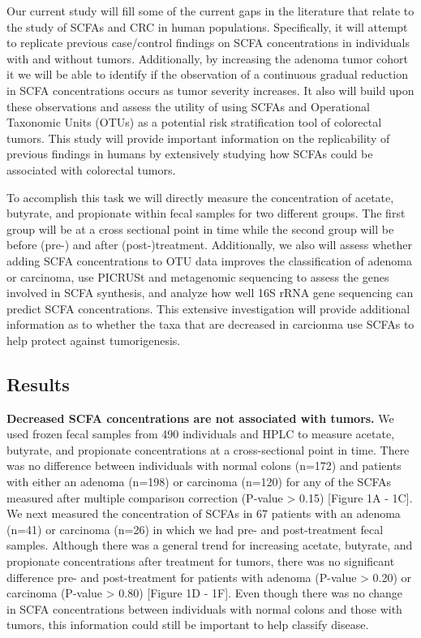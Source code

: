 \documentclass[11pt,]{article}
\begin{document}
Our current study will fill some of the current gaps in the literature
that relate to the study of SCFAs and CRC in human populations.
Specifically, it will attempt to replicate previous case/control
findings on SCFA concentrations in individuals with and without tumors.
Additionally, by increasing the adenoma tumor cohort it we will be able
to identify if the observation of a continuous gradual reduction in SCFA
concentrations occurs as tumor severity increases. It also will build
upon these observations and assess the utility of using SCFAs and
Operational Taxonomic Units (OTUs) as a potential risk stratification
tool of colorectal tumors. This study will provide important information
on the replicability of previous findings in humans by extensively
studying how SCFAs could be associated with colorectal tumors.

To accomplish this task we will directly measure the concentration of
acetate, butyrate, and propionate within fecal samples for two different
groups. The first group will be at a cross sectional point in time while
the second group will be before (pre-) and after (post-)treatment.
Additionally, we also will assess whether adding SCFA concentrations to
OTU data improves the classification of adenoma or carcinoma, use
PICRUSt and metagenomic sequencing to assess the genes involved in SCFA
synthesis, and analyze how well 16S rRNA gene sequencing can predict
SCFA concentrations. This extensive investigation will provide
additional information as to whether the taxa that are decreased in
carcionma use SCFAs to help protect against tumorigenesis.

\newpage

\subsection{Results}\label{results}

\textbf{Decreased SCFA concentrations are not associated with tumors.}
We used frozen fecal samples from 490 individuals and HPLC to measure
acetate, butyrate, and propionate concentrations at a cross-sectional
point in time. There was no difference between individuals with normal
colons (n=172) and patients with either an adenoma (n=198) or carcinoma
(n=120) for any of the SCFAs measured after multiple comparison
correction (P-value \textgreater{} 0.15) {[}Figure 1A - 1C{]}. We next
measured the concentration of SCFAs in 67 patients with an adenoma
(n=41) or carcinoma (n=26) in which we had pre- and post-treatment fecal
samples. Although there was a general trend for increasing acetate,
butyrate, and propionate concentrations after treatment for tumors,
there was no significant difference pre- and post-treatment for patients
with adenoma (P-value \textgreater{} 0.20) or carcinoma (P-value
\textgreater{} 0.80) {[}Figure 1D - 1F{]}. Even though there was no
change in SCFA concentrations between individuals with normal colons and
those with tumors, this information could still be important to help
classify disease.
\end{document}
